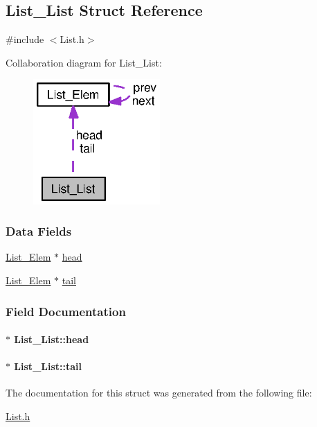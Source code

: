 \subsection{List\+\_\+\+List Struct Reference}
\label{struct_list___list}


{\ttfamily \#include $<$List.\+h$>$}



Collaboration diagram for List\+\_\+\+List\+:
\nopagebreak
\begin{figure}[H]
\begin{center}
\leavevmode
\includegraphics[width=137pt]{struct_list___list__coll__graph}
\end{center}
\end{figure}
\subsubsection*{Data Fields}
\begin{DoxyCompactItemize}
\item 
\hyperlink{struct_list___elem}{List\+\_\+\+Elem} $\ast$ \hyperlink{struct_list___list_ac6fe915aed884adffb39b7c5538b4b37}{head}
\item 
\hyperlink{struct_list___elem}{List\+\_\+\+Elem} $\ast$ \hyperlink{struct_list___list_aaa078249706663590a38d168b115171e}{tail}
\end{DoxyCompactItemize}


\subsubsection{Field Documentation}
\paragraph[{head}]{$\ast$ List\+\_\+\+List\+::head}\label{struct_list___list_ac6fe915aed884adffb39b7c5538b4b37}
\paragraph[{tail}]{$\ast$ List\+\_\+\+List\+::tail}\label{struct_list___list_aaa078249706663590a38d168b115171e}


The documentation for this struct was generated from the following file\+:\begin{DoxyCompactItemize}
\item 
\hyperlink{_list_8h}{List.\+h}\end{DoxyCompactItemize}
